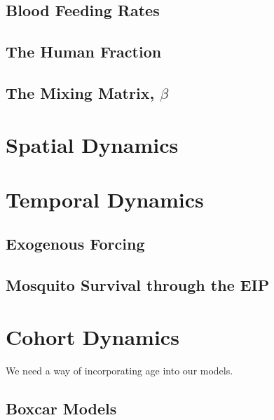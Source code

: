 \documentclass[
]{book}
\begin{document}
\hypertarget{blood-feeding-rates}{%
\section{Blood Feeding Rates}\label{blood-feeding-rates}}

\hypertarget{the-human-fraction}{%
\section{The Human Fraction}\label{the-human-fraction}}

\hypertarget{the-mixing-matrix-beta}{%
\section{\texorpdfstring{The Mixing Matrix, \(\beta\)}{The Mixing Matrix, \textbackslash beta}}\label{the-mixing-matrix-beta}}

\hypertarget{spatial-dynamics}{%
\chapter{Spatial Dynamics}\label{spatial-dynamics}}

\hypertarget{temporal-dynamics}{%
\chapter{Temporal Dynamics}\label{temporal-dynamics}}

\hypertarget{exogenous-forcing-2}{%
\section{Exogenous Forcing}\label{exogenous-forcing-2}}

\hypertarget{mosquito-survival-through-the-eip}{%
\section{Mosquito Survival through the EIP}\label{mosquito-survival-through-the-eip}}

\hypertarget{cohort-dynamics}{%
\chapter{Cohort Dynamics}\label{cohort-dynamics}}

We need a way of incorporating age into our models.

\hypertarget{boxcar-models}{%
\section{Boxcar Models}\label{boxcar-models}}
\end{document}
